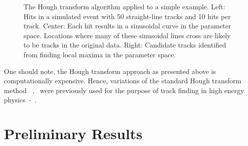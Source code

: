 \documentclass{JINST}
\begin{document}
\begin{figure}[!Hhtb]
\begin{center}
  \caption{The Hough transform algorithm applied to a simple example. Left: Hits in a simulated event with 50
    straight-line tracks and 10 hits per track. Center: Each hit results in a sinusoidal curve in the parameter
    space. Locations where many of these sinusoidal lines cross are likely to be tracks in the original data. Right:
    Candidate tracks identified from finding local maxima in the parameter space.\label{fig:hough}}
\end{center}
\end{figure}


One should note, the Hough transform approach as presented above is computationally expensive.
Hence, variations of the standard Hough transform method ~\cite{bib:LHT},~\cite{bib:AHT} 
were previously used for the purpose of track finding in high energy physics~\cite{bib:slac}-~\cite{bib:cosmicmu}.


\section{Preliminary Results}
\end{document}
